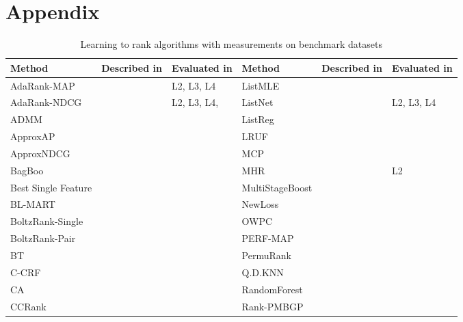 \documentclass{llncs}
\begin{document}
\section{Appendix}
\vspace{-0.3in}
\begin{table}[!hpt]
\centering
{\fontsize{7.6}{6.9}\selectfont
\caption{Learning to rank algorithms with measurements on benchmark datasets}
\label{tab:ltr_methods_used}
\begin{tabular}{lll|lll}\toprule
Method & Described in & Evaluated in & Method & Described in & Evaluated in\\
\midrule
AdaRank-MAP & \cite{Xu2007} & L2, L3, L4 & ListMLE & \cite{Xia2008} & \cite{Lin2010,Lin2011,Gao2014} \\
AdaRank-NDCG & \cite{Xu2007} & L2, L3, L4,  \cite{Busa-Fekete2013,Tan2013} & ListNet & \cite{Cao2007} & L2, L3, L4 \\ 
ADMM & \cite{Duh2011} & \cite{Duh2011} & ListReg & \cite{Wu2011} & \cite{Wu2011} \\ 
ApproxAP & \cite{Qin2010b} & \cite{Qin2010b} & LRUF & \cite{Torkestani2012b} & \cite{Torkestani2012b} \\ 
ApproxNDCG & \cite{Qin2010b} & \cite{Qin2010b} & MCP & \cite{Laporte2013} & \cite{Laporte2013} \\ 
BagBoo & \cite{Pavlov2010} & \cite{Ganjisaffar2011c} & MHR & \cite{Qin2007} & L2 \\ 
Best Single Feature &  & \cite{Gomes2013} &  MultiStageBoost & \cite{Kao2013} & \cite{Kao2013} \\ 
BL-MART & \cite{Ganjisaffar2011c} & \cite{Ganjisaffar2011c} &  NewLoss & \cite{Peng2010} & \cite{Peng2010} \\ 
BoltzRank-Single & \cite{Volkovs2009} & \cite{Volkovs2009,Volkovs2013} & OWPC & \cite{Usunier2009} & \cite{Usunier2009} \\ 
BoltzRank-Pair & \cite{Volkovs2009} & \cite{Volkovs2009,Ganjisaffar2011c,Volkovs2013} & PERF-MAP & \cite{Pan2011} & \cite{Torkestani2012b} \\ 
BT & \cite{Zhou2008} & \cite{Zhou2008} & PermuRank & \cite{Xu2008} & \cite{Xu2008} \\ 
C-CRF & \cite{Qin2008b} & \cite{Qin2008b} & Q.D.KNN & \cite{Geng2008} & \cite{Wang2013} \\ 
CA & \cite{Metzler2007} & \cite{Busa-Fekete2013,Tan2013} & RandomForest & \cite{Gomes2013} & \cite{Gomes2013} \\ 
CCRank & \cite{Wang2011c} & \cite{Wang2011c} & Rank-PMBGP & \cite{Sato2013} & \cite{Sato2013} \\ 

\end{tabular}}
\end{table}
\end{document}
